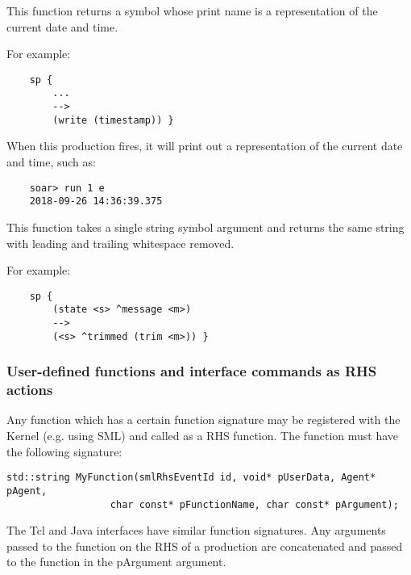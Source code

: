 \begin{description}
\item [\soarb{timestamp} --- ] 
	This function returns a symbol whose print name is a representation of the current date and time. 

	For example:
	
	\begin{verbatim}
	sp {
	    ...
	    -->
	    (write (timestamp)) }
	\end{verbatim}
	
	When this production fires, it will print out a representation of the current date and time, such as:
	
	\begin{verbatim}
	soar> run 1 e
	2018-09-26 14:36:39.375
	\end{verbatim}


\item [\soarb{trim} --- ] 
	This function takes a single string symbol argument and returns the same string with leading and trailing whitespace removed.

	For example:
	
	\begin{verbatim}
	sp {
	    (state <s> ^message <m>)
	    -->
	    (<s> ^trimmed (trim <m>)) }
	\end{verbatim}

\end{description}

\subdivider
\subsubsection*{User-defined functions and interface commands as RHS actions}

Any function which has a certain function signature may be registered with the Kernel (e.g. using SML) and called as a RHS function.  The function must have the following signature:

\begin{verbatim}
std::string MyFunction(smlRhsEventId id, void* pUserData, Agent* pAgent,
                  char const* pFunctionName, char const* pArgument);
\end{verbatim}

The Tcl and Java interfaces have similar function signatures. Any arguments passed to the function on the RHS of a production are concatenated and passed to the function in the pArgument argument.


